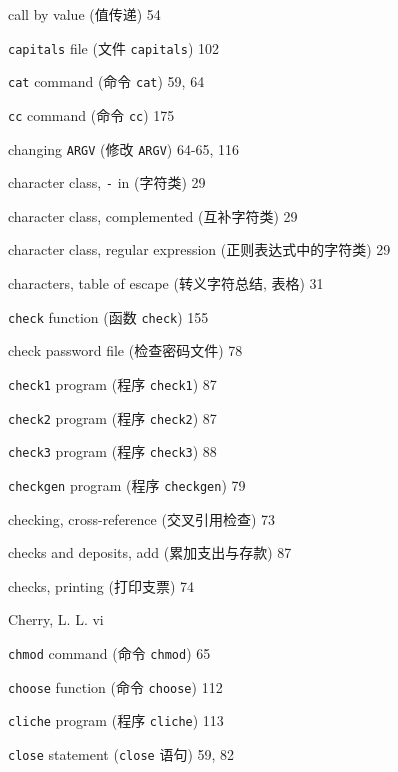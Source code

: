 \begin{multicols}{2}
\hangindent=2pc  call by value (值传递) 54

\hangindent=2pc  \verb'capitals' file (文件 \verb'capitals') 102

\hangindent=2pc  \verb'cat' command (命令 \verb'cat') 59, 64

\hangindent=2pc  \verb'cc' command (命令 \verb'cc') 175

\hangindent=2pc  changing \verb'ARGV' (修改 \verb'ARGV') 64-65, 116

\hangindent=2pc  character class, \verb'-' in (字符类) 29

\hangindent=2pc  character class, complemented (互补字符类) 29

\hangindent=2pc  character class, regular expression
(正则表达式中的字符类) 29

\hangindent=2pc  characters, table of escape (转义字符总结,
表格) 31

\hangindent=2pc  \verb'check' function (函数 \verb'check') 155

\hangindent=2pc  check password file (检查密码文件) 78

\hangindent=2pc  \verb'check1' program (程序 \verb'check1') 87

\hangindent=2pc  \verb'check2' program (程序 \verb'check2') 87

\hangindent=2pc  \verb'check3' program (程序 \verb'check3') 88

\hangindent=2pc  \verb'checkgen' program (程序 \verb'checkgen') 79

\hangindent=2pc  checking, cross-reference (交叉引用检查) 73

\hangindent=2pc  checks and deposits, add (累加支出与存款) 87

\hangindent=2pc  checks, printing (打印支票) 74

\hangindent=2pc  Cherry, L. L. vi

\hangindent=2pc  \verb'chmod' command (命令 \verb'chmod') 65

\hangindent=2pc  \verb'choose' function (命令 \verb'choose') 112

\hangindent=2pc  \verb'cliche' program (程序 \verb'cliche') 113

\hangindent=2pc  \verb'close' statement (\verb'close' 语句) 59, 82


\end{multicols}
